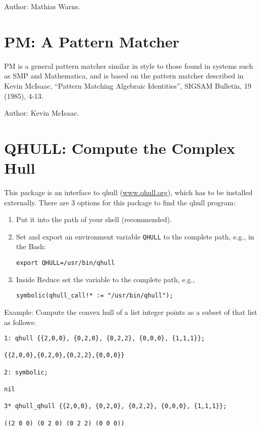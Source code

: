 Author: Mathias Warns.



\newpage

\section{PM: A \REDUCE Pattern Matcher}

PM is a general pattern matcher similar in style to those found in systems
such as SMP and Mathematica, and is based on the pattern matcher described
in Kevin McIsaac, ``Pattern Matching Algebraic Identities'', SIGSAM Bulletin,
19 (1985), 4-13.

Author: Kevin McIsaac.



\newpage


\section{QHULL: Compute the Complex Hull}



This package is an interface to qhull (\href{http://www.qhull.org}{www.qhull.org}),
which has to be installed externally.  There are 3 options for this
package to find the qhull program:
\begin{enumerate}
\item Put it into the path of your shell (recommended).
\item Set and export an environment variable \texttt{QHULL} to the complete path, e.g., in
the Bash:
\begin{verbatim}
export QHULL=/usr/bin/qhull
\end{verbatim}
\item Inside Reduce set the variable  to the complete path, e.g.,
\begin{verbatim}
symbolic(qhull_call!* := "/usr/bin/qhull");
\end{verbatim}
\end{enumerate}
Example:
Compute the convex hull of a list integer points as a subset
of that list as follows:
\begin{verbatim}
1: qhull {{2,0,0}, {0,2,0}, {0,2,2}, {0,0,0}, {1,1,1}};

{{2,0,0},{0,2,0},{0,2,2},{0,0,0}}

2: symbolic;

nil

3* qhull_qhull {{2,0,0}, {0,2,0}, {0,2,2}, {0,0,0}, {1,1,1}};

((2 0 0) (0 2 0) (0 2 2) (0 0 0))
\end{verbatim}

